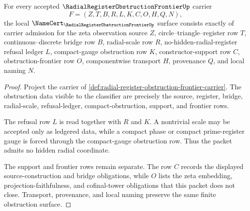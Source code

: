 \begin{theorem}
\label{thm:radial-register-obstruction-frontier-obligations}
For every accepted $\RadialRegisterObstructionFrontierUp$ carrier
$$
F=(Z,T,B,R,L,K,C,O,H,Q,N),
$$
the local $\NameCert_{\RadialRegisterObstructionFrontierUp}$ surface consists exactly of carrier admission for the zeta observation source $Z$, circle--triangle--register row $T$, continuous--discrete bridge row $B$, radial-scale row $R$, no-hidden-radial-register refusal ledger $L$, compact-gauge obstruction row $K$, constructor-support row $C$, obstruction-frontier row $O$, componentwise transport $H$, provenance $Q$, and local naming $N$.
\end{theorem}
\begin{proof}
Project the carrier of \autoref{def:radial-register-obstruction-frontier-carrier}. The obstruction data visible to the classifier are precisely the source, register, bridge, radial-scale, refusal-ledger, compact-obstruction, support, and frontier rows.

The refusal row $L$ is read together with $R$ and $K$. A nontrivial scale may be accepted only as ledgered data, while a compact phase or compact prime-register gauge is forced through the compact-gauge obstruction row. Thus the packet admits no hidden radial coordinate.

The support and frontier rows remain separate. The row $C$ records the displayed source-construction and bridge obligations, while $O$ lists the zeta embedding, projection-faithfulness, and cofinal-tower obligations that this packet does not close. Transport, provenance, and local naming preserve the same finite obstruction surface.
\end{proof}



